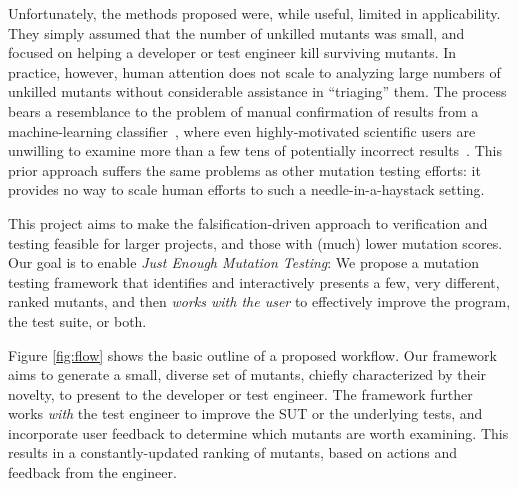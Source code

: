 Unfortunately, the
methods proposed were, while useful, limited in applicability.  They simply assumed that the number of unkilled mutants was
small, and focused on helping a developer or
test engineer kill surviving mutants.
In practice, however, human
attention does not scale to analyzing large numbers of
unkilled mutants without considerable assistance in ``triaging'' them.  The process bears a
resemblance to the problem of manual confirmation of results from a
machine-learning classifier~\cite{OnlyOracle,EndUserMistake}, where even highly-motivated scientific
users are unwilling to examine more than a few tens of
potentially incorrect results~\cite{Segal}.
This prior approach suffers the same problems as other
mutation testing efforts: it provides no way to
scale human efforts to such a needle-in-a-haystack setting.

This project aims to make the falsification-driven approach to verification and testing feasible for larger
projects, and those with (much) lower mutation scores.
Our goal is to enable \emph{Just Enough Mutation Testing}: We propose a mutation
testing framework that identifies and interactively presents a few, very
different, ranked mutants, and then \emph{works with the user} to 
effectively improve the program, the test suite, or both.

Figure \ref{fig:flow} shows the basic outline of a proposed workflow.
%
Our framework aims to generate a small, diverse set of
mutants, chiefly characterized by their novelty, to present to the developer or
test engineer.  The framework further works
 \emph{with} the test engineer to improve the SUT or
the underlying tests, and incorporate user feedback to determine which mutants are
worth examining.  This results in a constantly-updated ranking of mutants,
based on actions and feedback from the engineer.

